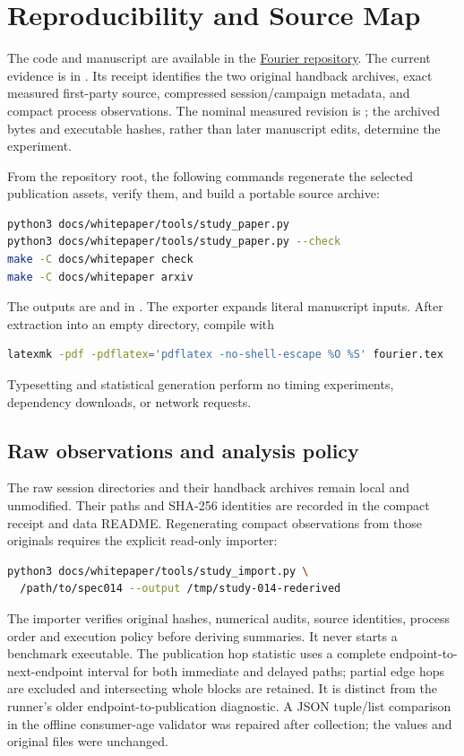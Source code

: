 \section{Reproducibility and Source Map}
\label{app:reproducibility}
The code and manuscript are available in the
\href{https://github.com/Kautenja/ArhythmeticUnits-Fourier}{Fourier repository}.
The current evidence is in . Its receipt
identifies the two original handback archives, exact measured first-party
source, compressed session/campaign metadata, and compact process observations.
The nominal measured revision is
; the archived bytes and executable
hashes, rather than later manuscript edits, determine the experiment.

From the repository root, the following commands regenerate the selected
publication assets, verify them, and build a portable source archive:
\begin{lstlisting}[language=bash]
python3 docs/whitepaper/tools/study_paper.py
python3 docs/whitepaper/tools/study_paper.py --check
make -C docs/whitepaper check
make -C docs/whitepaper arxiv
\end{lstlisting}
The outputs are  and  in
. The exporter expands literal manuscript inputs.
After extraction into an empty directory, compile with
\begin{lstlisting}[language=bash]
latexmk -pdf -pdflatex='pdflatex -no-shell-escape %O %S' fourier.tex
\end{lstlisting}
Typesetting and statistical generation perform no timing experiments,
dependency downloads, or network requests.

\subsection*{Raw observations and analysis policy}
The raw session directories and their handback archives remain local and
unmodified. Their paths and SHA-256 identities are recorded in the compact
receipt and data README. Regenerating compact observations from those originals
requires the explicit read-only importer:
\begin{lstlisting}[language=bash]
python3 docs/whitepaper/tools/study_import.py \
  /path/to/spec014 --output /tmp/study-014-rederived
\end{lstlisting}
The importer verifies original hashes, numerical audits, source identities,
process order and execution policy before deriving summaries. It never starts
a benchmark executable. The publication hop statistic uses a complete
endpoint-to-next-endpoint interval for both immediate and delayed paths;
partial edge hops are excluded and intersecting whole blocks are retained.
It is distinct from the runner's older endpoint-to-publication diagnostic.
A JSON tuple/list comparison in the offline consumer-age validator was repaired
after collection; the values and original files were unchanged.

